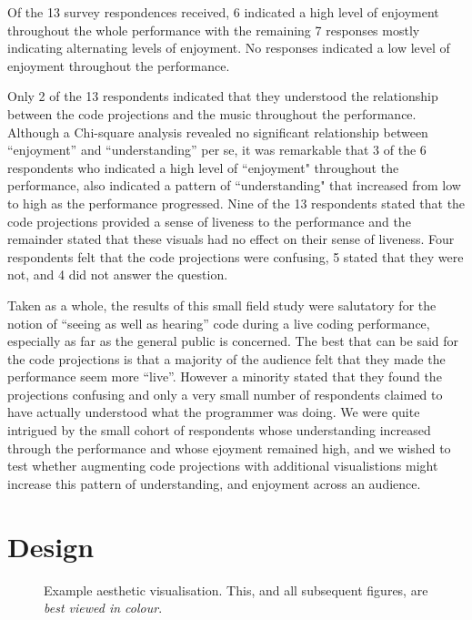 \documentclass{sig-alternate}
\begin{document}
Of the 13 survey respondences received, 6 indicated a high level of enjoyment throughout the whole performance with the remaining 7 responses mostly indicating alternating levels of enjoyment. No responses indicated a low level of enjoyment throughout the performance.

Only 2 of the 13 respondents indicated that they understood the relationship between the code projections and the music throughout the performance. Although a Chi-square analysis revealed no significant relationship between ``enjoyment'' and ``understanding'' per se, it was remarkable that 3 of the 6 respondents who indicated a high level of ``enjoyment" throughout the performance, also indicated a pattern of ``understanding" that increased from low to high as the performance progressed. Nine of the 13 respondents stated that the code projections provided a sense of liveness to the performance and the remainder stated that these visuals had no effect on their sense of liveness. Four respondents felt that the code projections were confusing, 5 stated that they were not, and 4 did not answer the question.

Taken as a whole, the results of this small field study were salutatory for the notion of ``seeing as well as hearing'' code during a live coding performance, especially as far as the general public is concerned. The best that can be said for the code projections is that a majority of the audience felt that they made the performance seem more ``live''. However a minority stated that they found the projections confusing and only a very small number of respondents claimed to have actually understood what the programmer was doing. We were quite intrigued by the small cohort of respondents whose understanding increased through the performance and whose ejoyment remained high, and we wished to test whether augmenting code projections with additional visualistions might increase this pattern of understanding, and enjoyment across an audience. 

\section{Design}

\begin{figure}
\centering
{}
\caption{Example aesthetic visualisation. This, and all subsequent figures, are {\it best viewed in colour}.}
\label{fig:aesthetic-visualisation}
\end{figure}
\end{document}
